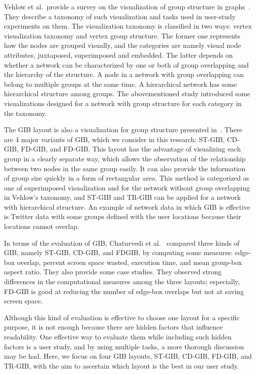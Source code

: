 \documentclass[review]{vgtc}                 %
\begin{document}
Vehlow et al.\ provide a survey on the visualization of group structure in graphs~\cite{Vehlow2017VisualizingGS}.
They describe a taxonomy of such visualization and tasks used in user-study experiments on them.
The visualization taxonomy is classified in two ways: vertex visualization taxonomy and vertex group structure.
The former one represents how the nodes are grouped visually, and the categories are namely visual node attributes, juxtaposed, superimposed and embedded.
The latter depends on whether a network can be characterized by one or both of group overlapping and the hierarchy of the structure.
A node in a network with group overlapping can belong to multiple groups at the same time.
A hierarchical network has some hierarchical structure among groups.
The abovementioned study introduced some visualizations designed for a network with group structure for each category in the taxonomy.

The GIB layout is also a visualization for group structure presented in~\cite{rodrigues2011group,chaturvedi2014group,onoue2017optimal}.
There are 4 major variants of GIB, which we consider in this research: ST-GIB, CD-GIB, FD-GIB, and FD-GIB.
This layout has the advantage of visualizing each group in a clearly separate way, which allows the observation of the relationship between two nodes in the same group easily.
It can also provide the information of group size quickly in a form of rectangular area.
This method is categorized as one of superimposed visualization and for the network without group overlapping in Vehlow's taxonomy, and ST-GIB and TR-GIB can be applied for a network with hierarchical structure.
An example of network data in which GIB is effective is Twitter data with some groups defined with the user locations because their locations cannot overlap.

In terms of the evaluation of GIB, Chaturvedi et al.~\cite{chaturvedi2014group} compared three kinds of GIB, namely ST-GIB, CD-GIB, and FDGIB, by computing some measures: edge-box overlap, percent screen space wasted, execution time, and mean group-box aspect ratio. They also provide some case studies. They observed strong differences in the computational measures among the three layouts; especially, FD-GIB is good at reducing the number of edge-box overlaps but not at saving screen space.

Although this kind of evaluation is effective to choose one layout for a specific purpose, it is not enough because there are hidden factors that influence readability. One effective way to evaluate them while including such hidden factors is a user study, and by using multiple tasks, a more thorough discussion may be had.
Here, we focus on four GIB layouts, ST-GIB, CD-GIB, FD-GIB, and TR-GIB, with the aim to ascertain which layout is the best in our user study.
\end{document}
